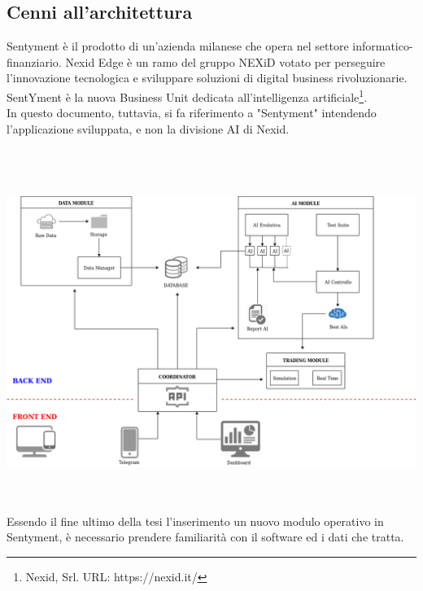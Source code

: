 \documentclass[a4paper,12pt]{report}
\begin{document}
\subsection{Cenni all'architettura}
Sentyment è il prodotto di un'azienda milanese che opera nel settore informatico-finanziario. Nexid Edge è un ramo del gruppo NEXiD votato per perseguire l'innovazione tecnologica e sviluppare soluzioni di digital business rivoluzionarie. SentYment è la nuova Business Unit dedicata all'intelligenza artificiale\footnote{Nexid, Srl. URL: https://nexid.it/}.\\
In questo documento, tuttavia, si fa riferimento a "Sentyment" intendendo l'applicazione sviluppata, e non la divisione AI di Nexid.\\~\\\\~\\
	\begin{fig}
	\includegraphics[width=\linewidth]{Sentyment}
	\label{Figura 10}
\end{fig}
\\~\\
Essendo il fine ultimo della tesi l'inserimento un nuovo modulo operativo in Sentyment, è necessario prendere familiarità con il software ed i dati che tratta.\\
\end{document}
